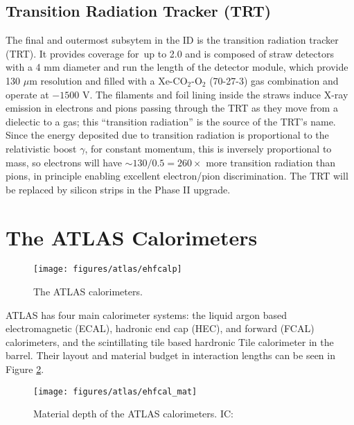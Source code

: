 \subsection{Transition Radiation Tracker (TRT)}
The final and outermost subsytem in the ID is the transition radiation tracker (TRT).  It provides coverage for \aeta\,up to 2.0 and is composed of straw detectors with a 4 mm diameter and run the length of the detector module, which provide 130 $\mu$m resolution and filled with a Xe-CO$_2$-O$_2$ (70-27-3) gas combination and operate at $-1500$ V.  The filaments and foil lining inside the straws induce X-ray emission in electrons and pions passing through the TRT as they move from a dielectic to a gas; this ``transition radiation'' is the source of the TRT's name.  Since the energy deposited due to transition radiation is proportional to the relativistic boost $\gamma$, for constant momentum, this is inversely proportional to mass, so electrons will have $\sim 130/0.5=260\times$ more transition radiation than pions, in principle enabling excellent electron/pion discrimination.  The TRT will be replaced by silicon strips in the Phase II upgrade.


\section{The ATLAS Calorimeters}
\begin{figure}[!htbp]\captionsetup{justification=centering}
  \centering
  \texttt{[image: figures/atlas/ehfcalp]}
  \caption{The ATLAS calorimeters.}
  \label{fig:indet}
\end{figure}

ATLAS has four main calorimeter systems: the liquid argon based electromagnetic (ECAL), hadronic end cap (HEC), and forward (FCAL) calorimeters, and the scintillating tile based hardronic Tile calorimeter in the barrel.  Their layout and material budget in interaction lengths can be seen in Figure \ref{fig:calbudget}.
\begin{figure}[!htbp]\captionsetup{justification=centering}
  \centering
  \texttt{[image: figures/atlas/ehfcal\_mat]}
  \caption{Material depth of the ATLAS calorimeters. IC: \cite{jinstpaper}}
  \label{fig:calbudget}
\end{figure}

